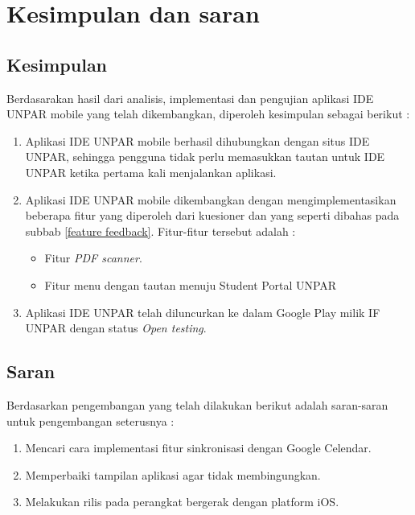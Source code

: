 \chapter{Kesimpulan dan saran}

\section{Kesimpulan}

Berdasarakan hasil dari analisis, implementasi dan pengujian aplikasi IDE UNPAR mobile yang telah dikembangkan, diperoleh kesimpulan sebagai berikut :

\begin{enumerate}
\item Aplikasi IDE UNPAR mobile berhasil dihubungkan dengan situs IDE UNPAR, sehingga pengguna tidak perlu memasukkan tautan untuk IDE UNPAR ketika pertama kali menjalankan aplikasi.

\item Aplikasi IDE UNPAR mobile dikembangkan dengan mengimplementasikan beberapa fitur yang diperoleh dari kuesioner dan yang seperti dibahas pada subbab \ref{feature feedback}. Fitur-fitur tersebut adalah :
	\begin{itemize}
		\item Fitur \textit{PDF scanner}.
		\item  Fitur menu dengan tautan menuju Student Portal UNPAR
	\end{itemize}
	
\item Aplikasi IDE UNPAR telah diluncurkan ke dalam Google Play milik IF UNPAR dengan status \textit{Open testing}.
\end{enumerate}

\section{Saran}

Berdasarkan pengembangan yang telah dilakukan berikut adalah saran-saran untuk pengembangan seterusnya :

\begin{enumerate}
\item Mencari cara implementasi fitur sinkronisasi dengan Google Celendar.
\item Memperbaiki tampilan aplikasi agar tidak membingungkan. 
\item Melakukan rilis pada perangkat bergerak dengan platform iOS.

\end{enumerate}

